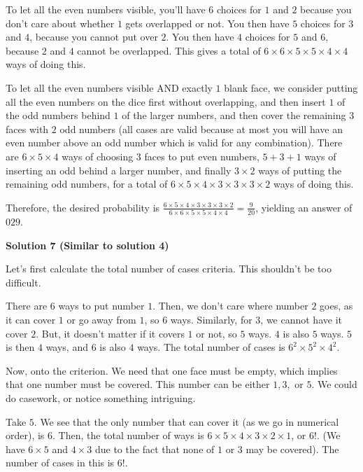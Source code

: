 \begin{enumerate}
 To let all the even numbers visible, you'll have $6$ choices for $1$ and $2$ because you don't care about whether $1$ gets overlapped or not. You then have $5$ choices for $3$ and $4$, because you cannot put over $2$. You then have $4$ choices for $5$ and $6$, because $2$ and $4$ cannot be overlapped. This gives a total of $6\times6\times5\times5\times4\times4$ ways of doing this.

 To let all the even numbers visible AND exactly $1$ blank face, we consider putting all the even numbers on the dice first without overlapping, and then insert $1$ of the odd numbers behind $1$ of the larger numbers, and then cover the remaining $3$ faces with $2$ odd numbers (all cases are valid because at most you will have an even number above an odd number which is valid for any combination). There are $6\times5\times4$ ways of choosing $3$ faces to put even numbers, $5 + 3 + 1$ ways of inserting an odd behind a larger number, and finally $3\times2$ ways of putting the remaining odd numbers, for a total of $6\times5\times4\times3\times3\times3\times2$ ways of doing this.

 Therefore, the desired probability is $\frac{6\times5\times4\times3\times3\times3\times2}{6\times6\times5\times5\times4\times4}=\frac{9}{20}$, yielding an answer of $\boxed{029}$.

 



\textbf{Solution 7 (Similar to solution 4)}

Let's first calculate the total number of cases criteria. This shouldn't be too difficult. 

 There are \( 6 \) ways to put number \( 1 \). Then, we don't care where number \( 2 \) goes, as it can cover \( 1 \) or go away from \( 1 \), so \( 6 \) ways. Similarly, for \( 3 \), we cannot have it cover \( 2 \). But, it doesn't matter if it covers \( 1 \) or not, so \( 5 \) ways. \( 4 \) is also \( 5 \) ways. \( 5 \) is then \( 4 \) ways, and \( 6 \) is also \( 4 \) ways. The total number of cases is \( 6^2 \times 5^2 \times 4^2 \).

 Now, onto the criterion. We need that one face must be empty, which implies that one number must be covered. This number can be either \( 1, 3, \) or \( 5 \). We could do casework, or notice something intriguing.

 Take \( 5 \). We see that the only number that can cover it (as we go in numerical order), is \( 6 \). Then, the total number of ways is \( 6 \times 5 \times 4 \times 3 \times 2 \times 1 \), or \( 6! \). (We have \( 6 \times 5 \) and \( 4 \times 3 \) due to the fact that none of \( 1 \) or \( 3 \) may be covered). The number of cases in this is \( 6! \).


\end{enumerate}

